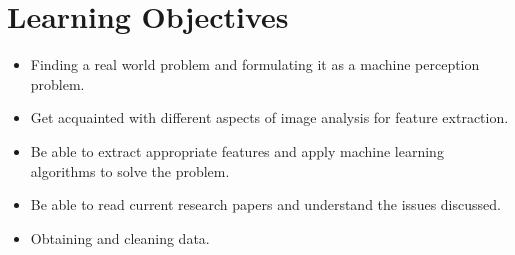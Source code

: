 \documentclass[12pt,a4paper]{article}
\begin{document}
\section{Learning Objectives}
\begin{itemize}
\item Finding a real world problem and formulating it as a machine perception problem.

\item Get acquainted with different aspects of image analysis for feature extraction.

\item Be able to extract appropriate features and apply machine learning algorithms to solve the problem.

\item Be able to read current research papers and understand the issues discussed.

\item Obtaining and cleaning data.
\end{itemize}
\end{document}
